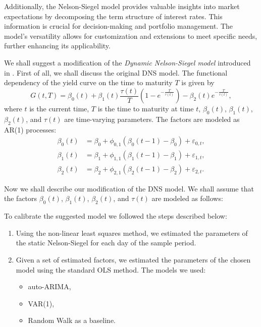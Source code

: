         Additionally, the Nelson-Siegel model provides valuable insights into market expectations by decomposing the 
        term structure of interest rates. This information is crucial for decision-making and portfolio management. 
        The model's versatility allows for customization and extensions to meet specific needs, further enhancing its 
        applicability.
        
        We shall suggest a modification of the \emph{Dynamic Nelson-Siegel model} introduced in \cite{Diebold2006}.
        First of all, we shall discuss the original DNS model. The functional dependency of the yield curve on the 
        time to maturity $T$ is given by
        \begin{equation}\label{eq:DNS}
            G(t, T) = \beta_0(t) + \beta_1(t)\frac{\tau(t)}{T}\left(1-e^{-\frac{T}{\tau(t)}}\right)-\beta_2(t)  e^{-\frac{T}{\tau(t)}},
        \end{equation}
        where $t$ is the current time, $T$ is the time to maturity at time $t$, $\beta_0(t)$, $\beta_1(t)$, 
        $\beta_2(t)$, and $\tau(t)$ are time-varying parameters. The factors are modeled as AR(1) processes:
        \begin{equation}\label{eq:DNS_AR}
            \begin{aligned}
                \beta_0(t) &= \beta_0 + \phi_{0,1}(\beta_0(t-1)-\beta_0) + \varepsilon_{0,t}, \\
                \beta_1(t) &= \beta_1 + \phi_{1,1}(\beta_1(t-1)-\beta_1) + \varepsilon_{1,t}, \\
                \beta_2(t) &= \beta_2 + \phi_{2,1}(\beta_2(t-1)-\beta_2) + \varepsilon_{2,t}.
            \end{aligned}
        \end{equation}

        Now we shall describe our modification of the DNS model. We shall assume that the factors $\beta_0(t)$,
        $\beta_1(t)$, $\beta_2(t)$, and $\tau(t)$ are modeled as follows:




        To calibrate the suggested model we followed the steps described below:
        \begin{enumerate}
            \item Using the non-linear least squares method, we estimated the parameters of the static Nelson-Siegel for each day of the sample period.
            \item Given a set of estimated factors, we estimated the parameters of the chosen model using the standard OLS method. The models we used:
                \begin{itemize}
                    \item auto-ARIMA,
                    \item VAR(1),
                    \item Random Walk as a baseline.
                \end{itemize}
        \end{enumerate}

